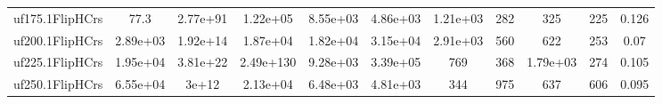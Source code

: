 \begin{table}[htbp]
\begin{tabular}{|ccccccccccc|}
uf175.1FlipHCrs & 77.3 & 2.77e+91 & 1.22e+05 & 8.55e+03 & 4.86e+03 & 1.21e+03 &  282 &  325 &  225 & 0.126 \\
uf200.1FlipHCrs & 2.89e+03 & 1.92e+14 & 1.87e+04 & 1.82e+04 & 3.15e+04 & 2.91e+03 &  560 &  622 &  253 & 0.07 \\
uf225.1FlipHCrs & 1.95e+04 & 3.81e+22 & 2.49e+130 & 9.28e+03 & 3.39e+05 &  769 &  368 & 1.79e+03 &  274 & 0.105 \\
uf250.1FlipHCrs & 6.55e+04 & 3e+12 & 2.13e+04 & 6.48e+03 & 4.81e+03 &  344 &  975 &  637 &  606 & 0.095 \\
\hline
\end{tabular}
\end{table}
